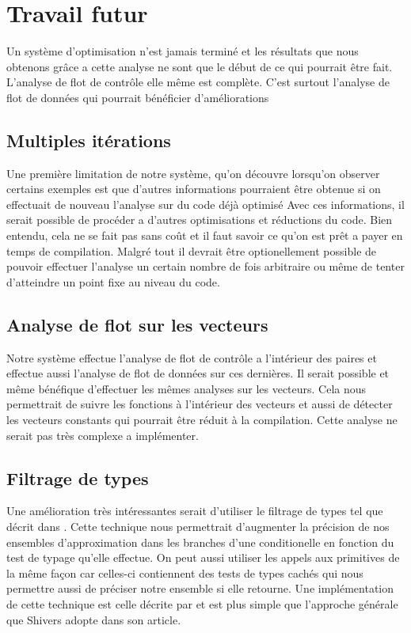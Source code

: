 
\section{Travail futur}

Un système d'optimisation n'est jamais terminé et les résultats que
nous obtenons grâce a cette analyse ne sont que le début de ce qui
pourrait être fait. L'analyse de flot de contrôle elle même est
complète.  C'est surtout l'analyse de flot de données qui pourrait
bénéficier d'améliorations

\subsection{Multiples itérations}

Une première limitation de notre système, qu'on découvre lorsqu'on
observer certains exemples est que d'autres informations pourraient être
obtenue si on effectuait de nouveau l'analyse sur du code déjà optimisé
Avec ces informations, il serait possible de procéder a d'autres optimisations
et réductions du code. Bien entendu, cela ne se fait pas sans coût et il
faut savoir ce qu'on est prêt a payer en temps de compilation. Malgré tout
il devrait être optionellement possible de pouvoir effectuer l'analyse
un certain nombre de fois arbitraire ou même de tenter d'atteindre un point
fixe au niveau du code.

\subsection{Analyse de flot sur les vecteurs}

Notre système effectue l'analyse de flot de contrôle a l'intérieur des paires
et effectue aussi l'analyse de flot de données sur ces dernières. Il serait
possible et même bénéfique d'effectuer les mêmes analyses sur les vecteurs.
Cela nous permettrait de suivre les fonctions à l'intérieur des vecteurs
et aussi de détecter les vecteurs constants qui pourrait être réduit à
la compilation. Cette analyse ne serait pas très complexe a implémenter.

\subsection{Filtrage de types}

Une amélioration très intéressantes serait d'utiliser le
filtrage de types tel que décrit dans \cite{shivers88}.  Cette
technique nous permettrait d'augmenter la précision de nos ensembles
d'approximation dans les branches d'une conditionelle en fonction du
test de typage qu'elle effectue. On peut aussi utiliser les appels aux
primitives de la même façon car celles-ci contiennent des tests de
types cachés qui nous permettre aussi de préciser notre ensemble si
elle retourne. Une implémentation de cette technique est celle décrite
par \cite{boucher2000} et est plus simple que l'approche générale que
Shivers adopte dans son article.

